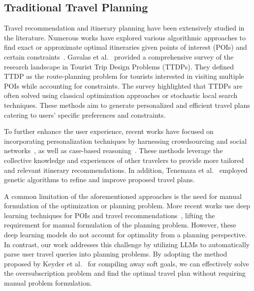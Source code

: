 \documentclass[letterpaper]{article}
\begin{document}
\subsection{Traditional Travel Planning}
Travel recommendation and itinerary planning have been extensively studied in the literature. Numerous works have explored various algorithmic approaches to find exact or approximate optimal itineraries given points of interest (POIs) and certain constraints~\cite{berka2004designing, expertsystems08-samap, moreno2013sigtur, CitytripPlanner_ExpertSystems2011, rodriguez2013gat, ETourism_Sebastia_IJAIT09, IEEETrans_itineraryplanning, HTN_temporal_travel_plan, MIP_travel_planner}. Gavalas et al.~\cite{gavalas2014survey} provided a comprehensive survey of the research landscape in Tourist Trip Design Problems (TTDPs). They defined TTDP as the route-planning problem for tourists interested in visiting multiple POIs while accounting for constraints. The survey highlighted that TTDPs are often solved using classical optimization approaches or stochastic local search techniques. These methods aim to generate personalized and efficient travel plans catering to users' specific preferences and constraints.

To further enhance the user experience, recent works have focused on incorporating personalization techniques by harnessing crowdsourcing and social networks~\cite{DBLP:conf/aaai/ManikondaCDTK14, lucas2012hybrid, eswa-ondroad, IEEETrans_itineraryplanning, DBLP:journals/ipm/BrilhanteMNPR15, majid2014system}, as well as case-based reasoning~\cite{ricci2006case}. These methods leverage the collective knowledge and experiences of other travelers to provide more tailored and relevant itinerary recommendations. In addition, Tenemaza et al.~\cite{tenemaza2020improving} employed genetic algorithms to refine and improve proposed travel plans.

A common limitation of the aforementioned approaches is the need for manual formulation of the optimization or planning problem. More recent works use deep learning techniques for POIs and travel recommendations~\cite{halder2024survey}, lifting the requirement for manual formulation of the planning problem. However, these deep learning models do not account for optimality from a planning perspective. In contrast, our work addresses this challenge by utilizing LLMs to automatically parse user travel queries into planning problems. By adopting the method proposed by Keyder et al.~\cite{keyder2009soft} for compiling away soft goals, we can effectively solve the oversubscription problem and find the optimal travel plan without requiring manual problem formulation.
\end{document}
